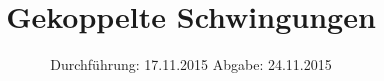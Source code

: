 

\subject{VERSUCH NUMMER 355}
\title{Gekoppelte Schwingungen}
\date{
  Durchführung: 17.11.2015
  \hspace{3em}
  Abgabe: 24.11.2015}



\maketitle
\thispagestyle{empty}
\tableofcontents
\newpage






\printbibliography


